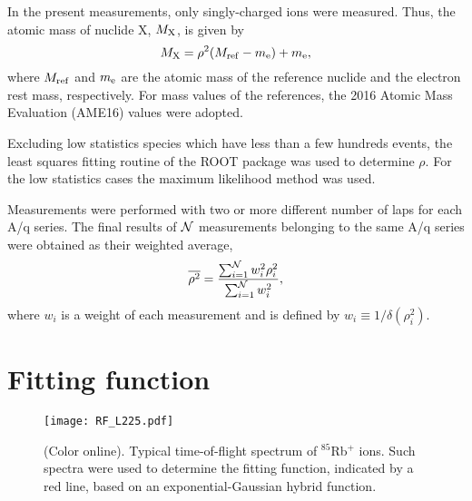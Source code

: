 \documentclass[3p]{elsarticle}
\begin{document}
In the present measurements, only singly-charged ions were measured. Thus, the atomic mass of nuclide X, $M_{\rm X}$, is given by 
\begin{equation}
M_{\rm X} = \rho^2 (M_{\rm ref} - m_{\rm e}) + m_{\rm e},
\end{equation}
where $M_{\rm ref}$ and $m_{\rm e}$ are the atomic mass of the reference nuclide and the electron rest mass, respectively. For mass values of the references, the 2016 Atomic Mass Evaluation (AME16) values \citep{Huang2016,Wang2016} were adopted. 

Excluding low statistics species which have less than a few hundreds events, the least squares fitting routine of the ROOT package \citep{Brun1997} was used to determine $\rho$. For the low statistics cases the maximum likelihood method was used. 


Measurements were performed with two or more different number of laps for each A/q series. The final results of ${\cal N}$ measurements belonging to the same A/q series were obtained as their weighted average,
\begin{equation}
\overline{\rho^2} = \frac{\sum_{i=1}^{\cal N} w^2_i \rho^2_i}{\sum_{i=1}^{\cal N} w^2_i},
\end{equation}
where $w_i$ is a weight of each measurement and is defined by $w_i \equiv 1/ \delta (\rho_i^2)$.


\section{Fitting function}

\begin{figure}[h]
  \centering
   \texttt{[image: RF\_L225.pdf]}
  \caption{(Color online). Typical time-of-flight spectrum of $^{85}$Rb$^{+}$ ions. Such spectra were used to determine the fitting function, indicated by a red line, based on an exponential-Gaussian hybrid function. \label{RF}}
  \vspace*{-15pt}
\end{figure}
\end{document}
